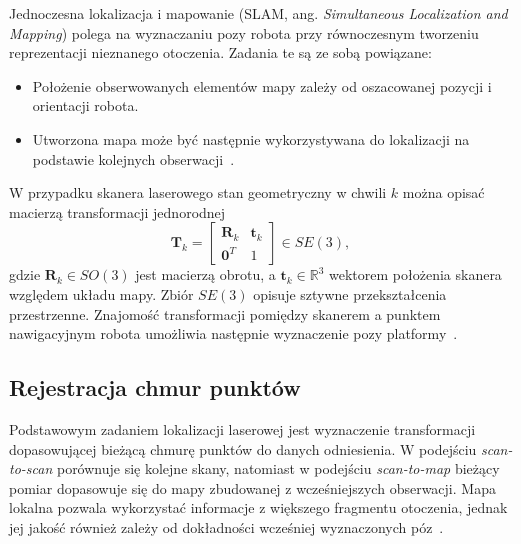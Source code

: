 \documentclass[a4paper,twoside,12pt]{book}
\begin{document}
Jednoczesna lokalizacja i mapowanie (SLAM, ang. \textit{Simultaneous Localization and Mapping}) polega na wyznaczaniu pozy robota przy równoczesnym tworzeniu reprezentacji nieznanego otoczenia. Zadania te są ze sobą powiązane: 
\begin{itemize}
    \item Położenie obserwowanych elementów mapy zależy od oszacowanej pozycji i orientacji robota.
    \item Utworzona mapa może być następnie wykorzystywana do lokalizacji na podstawie kolejnych obserwacji~\cite{Blanco_Claraco_RSS_19}.
\end{itemize}

W przypadku skanera laserowego stan geometryczny w chwili $k$ można opisać macierzą transformacji jednorodnej
\begin{equation}
    \mathbf{T}_k =
    \begin{bmatrix}
        \mathbf{R}_k & \mathbf{t}_k \\
        \mathbf{0}^{T} & 1
    \end{bmatrix}
    \in SE(3),
    \label{eq:slam-transformacja}
\end{equation}
gdzie $\mathbf{R}_k \in SO(3)$ jest macierzą obrotu, a $\mathbf{t}_k \in \mathbb{R}^{3}$ wektorem położenia skanera względem układu mapy. Zbiór $SE(3)$ opisuje sztywne przekształcenia przestrzenne. Znajomość transformacji pomiędzy skanerem a punktem nawigacyjnym robota umożliwia następnie wyznaczenie pozy platformy~\cite{rb3_barfoot2017}.

\subsection{Rejestracja chmur punktów}

Podstawowym zadaniem lokalizacji laserowej jest wyznaczenie transformacji dopasowującej bieżącą chmurę punktów do danych odniesienia. W podejściu \textit{scan-to-scan} porównuje się kolejne skany, natomiast w podejściu \textit{scan-to-map} bieżący pomiar dopasowuje się do mapy zbudowanej z wcześniejszych obserwacji. Mapa lokalna pozwala wykorzystać informacje z większego fragmentu otoczenia, jednak jej jakość również zależy od dokładności wcześniej wyznaczonych póz~\cite{blanco2025mola_lo}.
\end{document}
